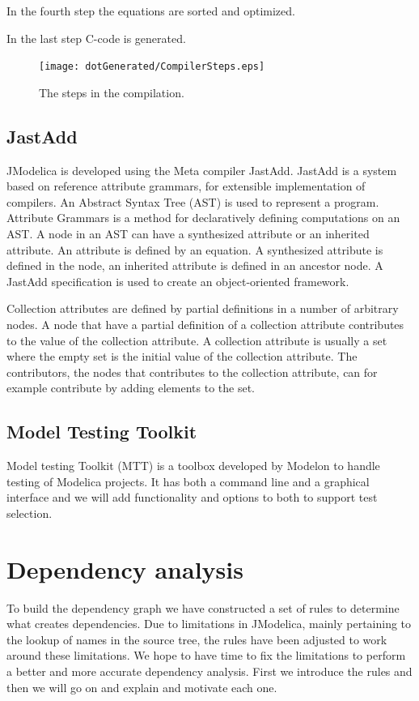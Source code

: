 \documentclass{cslthse-msc}
\begin{document}
In the fourth step the equations are sorted and optimized.

In the last step C-code is generated.\cite{aakesson2010implementation}

\begin{figure}[!htbp]
    \centering
    {\texttt{[image: dotGenerated/CompilerSteps.eps]}}
    \caption{The steps in the compilation.}
    \label{fig:compilerSteps}
\end{figure}

\section{JastAdd}
JModelica is developed using the Meta compiler JastAdd. JastAdd is a system based on reference attribute grammars, for extensible implementation of compilers. An Abstract Syntax Tree (AST) is used to represent a program. Attribute Grammars is a method for declaratively defining computations on an AST. A node in an AST can have a synthesized attribute or an inherited attribute. An attribute is defined by an equation. A synthesized attribute is defined in the node, an inherited attribute is defined in an ancestor node. A JastAdd specification is used to create an object-oriented framework.~\cite{aakesson2008development}

Collection attributes are defined by partial definitions in a number of arbitrary nodes. A node that have a partial definition of a collection attribute contributes to the value of the collection attribute. A collection attribute is usually a set where the empty set is the initial value of the collection attribute. The contributors, the nodes that contributes to the collection attribute, can for example contribute by adding elements to the set.~\cite{magnusson2007extending}

\section{Model Testing Toolkit}
Model testing Toolkit (MTT) is a toolbox developed by Modelon to handle testing of Modelica projects. It has both a command line and a graphical interface and we will add functionality and options to both to support test selection.

\chapter[Dependency analysis]{Dependency analysis}
To build the dependency graph we have constructed a set of rules to determine what creates dependencies. Due to limitations in JModelica, mainly pertaining to the lookup of names in the source tree, the rules have been adjusted to work around these limitations. We hope to have time to fix the limitations to perform a better and more accurate dependency analysis. First we introduce the rules and then we will go on and explain and motivate each one.
\end{document}
